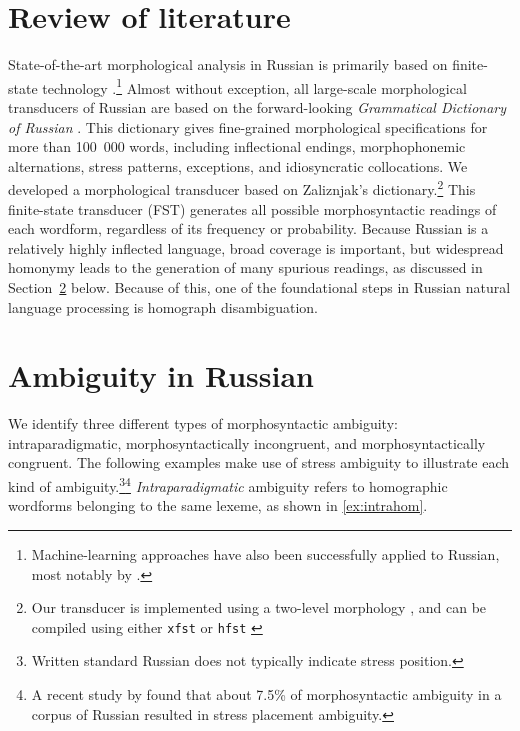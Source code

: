 \documentclass[11pt]{article}
\begin{document}
\section{Review of literature}
\label{sec:lit}
State-of-the-art morphological analysis in Russian is primarily based on
finite-state technology
\cite{Nozhov-03,Segalovich-03}.\footnote{Machine-learning approaches have also been successfully applied to Russian, most notably by 
.} Almost without exception, all large-scale 
morphological transducers of Russian are based on the
forward-looking \emph{Grammatical Dictionary of Russian} \cite{Zaliznjak-77}.
This dictionary gives fine-grained morphological specifications for more than
100~000 words, including inflectional endings, morphophonemic alternations, 
stress patterns, exceptions, and idiosyncratic collocations.
We developed a morphological transducer based on Zaliznjak's dictionary.\footnote{Our transducer is implemented using a two-level 
morphology \cite{Koskenniemi-84}, and can be compiled using either {\tt xfst}
\cite{Beesley.Karttunen-03} or {\tt hfst} \cite{hfst-11}} This finite-state transducer (FST) generates all possible 
morphosyntactic readings of each wordform, regardless of its frequency or probability. Because Russian is a relatively highly inflected language, broad coverage is important, but widespread homonymy leads to the generation of many spurious readings, as discussed in Section~\ref{ambiguity} below. Because of this, one of the foundational steps in Russian natural language processing is homograph disambiguation.






\section{Ambiguity in Russian} \label{ambiguity}

We identify three different types of morphosyntactic ambiguity: 
intraparadigmatic, morphosyntactically incongruent, and morphosyntactically 
congruent. The following examples make use of stress ambiguity to illustrate 
each kind of ambiguity.\footnote{Written standard Russian does not typically
indicate stress position.}\footnote{A recent study by  
found that about 7.5\% of 
morphosyntactic ambiguity in a corpus of Russian resulted in stress placement 
ambiguity.} \emph{Intraparadigmatic} ambiguity refers to homographic 
wordforms belonging to the same lexeme, as shown in \ref{ex:intrahom}. 
\end{document}
